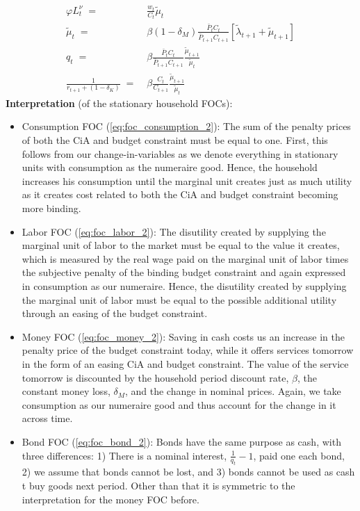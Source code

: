 \documentclass[a4paper, 12pt]{article}
\begin{document}
\begin{Answer}
\begin{small}
\begin{enumerate}
\begin{align}
				\varphi L_t^\nu \; = & \; \frac{w_t}{C_t} \tilde{\mu}_t\label{eq:foc_labor_2}\\%
				\tilde{\mu}_t \; = & \; \beta \left(1-\delta_M\right) \frac{\bar{P}_t C_t}{\bar{P}_{t+1} C_{t+1}} \left[\tilde{\lambda}_{t+1} + \tilde{\mu}_{t+1}\right]\label{eq:foc_money_2}\\%
				q_t \; = & \; \beta \frac{\bar{P}_t C_t}{\bar{P}_{t+1} C_{t+1}} \frac{\tilde{\mu}_{t+1}}{\tilde{\mu}_t}\label{eq:foc_bond_2}\\%
				\frac{1}{r_{t+1} + (1-\delta_K)} \; = & \; \beta \frac{C_t}{C_{t+1}} \frac{\tilde{\mu}_{t+1}}{\tilde{\mu}_t} \label{eq:foc_capital_2}%
			\end{align}%
			\textbf{Interpretation} (of the stationary household FOCs):%
			\begin{itemize}%
				\item[$\blacktriangleright$] Consumption FOC (\ref{eq:foc_consumption_2}): The sum of the penalty prices of both the CiA and budget constraint must be equal to one. First, this follows from our change-in-variables as we denote everything in stationary units with consumption as the numeraire good. Hence, the household increases his consumption until the marginal unit creates just as much utility as it creates cost related to both the CiA and budget constraint becoming more binding.%
				\item[$\blacktriangleright$] Labor FOC (\ref{eq:foc_labor_2}): The disutility created by supplying the marginal unit of labor to the market must be equal to the value it creates, which is measured by the real wage paid on the marginal unit of labor times the subjective penalty of the binding budget constraint and again expressed in consumption as our numeraire. Hence, the disutility created by supplying the marginal unit of labor must be equal to the possible additional utility through an easing of the budget constraint.%
				\item[$\blacktriangleright$] Money FOC (\ref{eq:foc_money_2}): Saving in cash costs us an increase in the penalty price of the budget constraint today, while it offers services tomorrow in the form of an easing CiA and budget constraint. The value of the service tomorrow is discounted by the household period discount rate, $\beta$, the constant money loss, $\delta_M$, and the change in nominal prices. Again, we take consumption as our numeraire good and thus account for the change in it across time.%
				\item[$\blacktriangleright$] Bond FOC (\ref{eq:foc_bond_2}): Bonds have the same purpose as cash, with three differences: 1) There is a nominal interest, $\frac{1}{q_t}-1$, paid one each bond, 2) we assume that bonds cannot be lost, and 3) bonds cannot be used as cash t buy goods next period. Other than that it is symmetric to the interpretation for the money FOC before.%

\end{itemize}
\end{enumerate}
\end{small}
\end{Answer}
\end{document}
